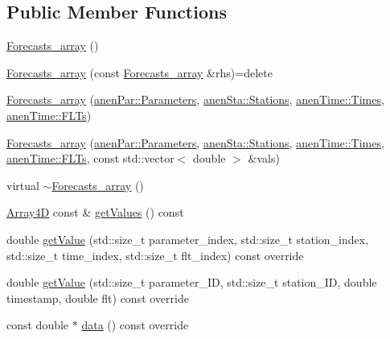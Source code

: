 \subsection*{Public Member Functions}
\begin{DoxyCompactItemize}
\item 
\mbox{\hyperlink{class_forecasts__array_a4304d0d78a0c475b3392c99e14c0891b}{Forecasts\+\_\+array}} ()
\item 
\mbox{\hyperlink{class_forecasts__array_a46a39594c6bc4f9b08ef3ff752147695}{Forecasts\+\_\+array}} (const \mbox{\hyperlink{class_forecasts__array}{Forecasts\+\_\+array}} \&rhs)=delete
\item 
\mbox{\hyperlink{class_forecasts__array_a7102efd52c1ed471ac9d05960e73e4a0}{Forecasts\+\_\+array}} (\mbox{\hyperlink{classanen_par_1_1_parameters}{anen\+Par\+::\+Parameters}}, \mbox{\hyperlink{classanen_sta_1_1_stations}{anen\+Sta\+::\+Stations}}, \mbox{\hyperlink{classanen_time_1_1_times}{anen\+Time\+::\+Times}}, \mbox{\hyperlink{classanen_time_1_1_f_l_ts}{anen\+Time\+::\+F\+L\+Ts}})
\item 
\mbox{\hyperlink{class_forecasts__array_ac50579e66269d92ebdbc4dc1ea07f7c8}{Forecasts\+\_\+array}} (\mbox{\hyperlink{classanen_par_1_1_parameters}{anen\+Par\+::\+Parameters}}, \mbox{\hyperlink{classanen_sta_1_1_stations}{anen\+Sta\+::\+Stations}}, \mbox{\hyperlink{classanen_time_1_1_times}{anen\+Time\+::\+Times}}, \mbox{\hyperlink{classanen_time_1_1_f_l_ts}{anen\+Time\+::\+F\+L\+Ts}}, const std\+::vector$<$ double $>$ \&vals)
\item 
virtual \mbox{\hyperlink{class_forecasts__array_a7e13cb82b1ab76a45946cff992c7fff4}{$\sim$\+Forecasts\+\_\+array}} ()
\item 
\mbox{\hyperlink{class_array4_d}{Array4D}} const  \& \mbox{\hyperlink{class_forecasts__array_afd9f8bb1e1736bf3665073d95ae5ef8c}{get\+Values}} () const
\item 
double \mbox{\hyperlink{class_forecasts__array_add3a617d4e63dba10bf369fe41714a24}{get\+Value}} (std\+::size\+\_\+t parameter\+\_\+index, std\+::size\+\_\+t station\+\_\+index, std\+::size\+\_\+t time\+\_\+index, std\+::size\+\_\+t flt\+\_\+index) const override
\item 
double \mbox{\hyperlink{class_forecasts__array_a38f7b890af0947e0d2022ce5bc5bb514}{get\+Value}} (std\+::size\+\_\+t parameter\+\_\+\+ID, std\+::size\+\_\+t station\+\_\+\+ID, double timestamp, double flt) const override
\item 
const double $\ast$ \mbox{\hyperlink{class_forecasts__array_ae7af8dfc4b7a7970310d06bf71069200}{data}} () const override

\end{DoxyCompactItemize}
